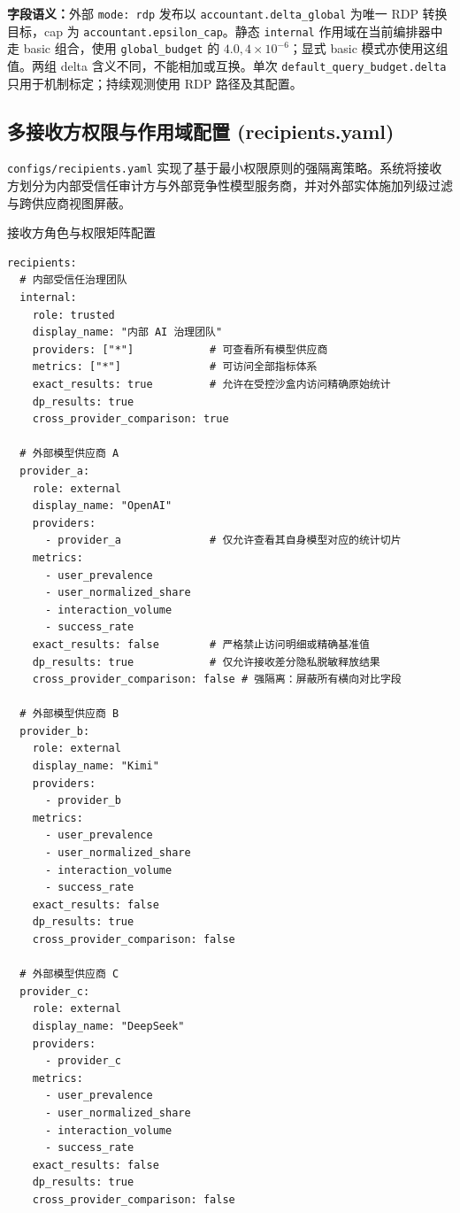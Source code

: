 \textbf{字段语义：}外部 \texttt{mode: rdp} 发布以 \texttt{accountant.delta\_global} 为唯一 RDP 转换目标，cap 为 \texttt{accountant.epsilon\_cap}。静态 \texttt{internal} 作用域在当前编排器中走 basic 组合，使用 \texttt{global\_budget} 的 $4.0,4\times10^{-6}$；显式 basic 模式亦使用这组值。两组 delta 含义不同，不能相加或互换。单次 \texttt{default\_query\_budget.delta} 只用于机制标定；持续观测使用 RDP 路径及其配置。

\subsection{多接收方权限与作用域配置 (recipients.yaml)}

\texttt{configs/recipients.yaml} 实现了基于最小权限原则的强隔离策略。系统将接收方划分为内部受信任审计方与外部竞争性模型服务商，并对外部实体施加列级过滤与跨供应商视图屏蔽。

\begin{techbox}{接收方角色与权限矩阵配置}
\begin{verbatim}
recipients:
  # 内部受信任治理团队
  internal:
    role: trusted
    display_name: "内部 AI 治理团队"
    providers: ["*"]            # 可查看所有模型供应商
    metrics: ["*"]              # 可访问全部指标体系
    exact_results: true         # 允许在受控沙盒内访问精确原始统计
    dp_results: true
    cross_provider_comparison: true

  # 外部模型供应商 A
  provider_a:
    role: external
    display_name: "OpenAI"
    providers:
      - provider_a              # 仅允许查看其自身模型对应的统计切片
    metrics:
      - user_prevalence
      - user_normalized_share
      - interaction_volume
      - success_rate
    exact_results: false        # 严格禁止访问明细或精确基准值
    dp_results: true            # 仅允许接收差分隐私脱敏释放结果
    cross_provider_comparison: false # 强隔离：屏蔽所有横向对比字段

  # 外部模型供应商 B
  provider_b:
    role: external
    display_name: "Kimi"
    providers:
      - provider_b
    metrics:
      - user_prevalence
      - user_normalized_share
      - interaction_volume
      - success_rate
    exact_results: false
    dp_results: true
    cross_provider_comparison: false

  # 外部模型供应商 C
  provider_c:
    role: external
    display_name: "DeepSeek"
    providers:
      - provider_c
    metrics:
      - user_prevalence
      - user_normalized_share
      - interaction_volume
      - success_rate
    exact_results: false
    dp_results: true
    cross_provider_comparison: false
\end{verbatim}
\end{techbox}

